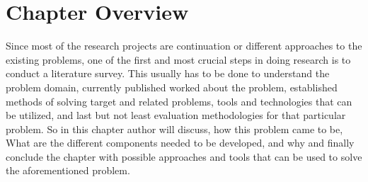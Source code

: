 \section{Chapter Overview}

Since most of the research projects are continuation or different approaches to the existing problems, one of the first and most crucial steps in doing research is to conduct a literature survey. This usually has to be done to understand the problem domain, currently published worked about the problem, established methods of solving target and related problems, tools and technologies that can be utilized, and last but not least evaluation methodologies for that particular problem. So in this chapter author will discuss, how this problem came to be, What are the different components needed to be developed, and why and finally conclude the chapter with possible approaches and tools that can be used to solve the aforementioned problem. 

